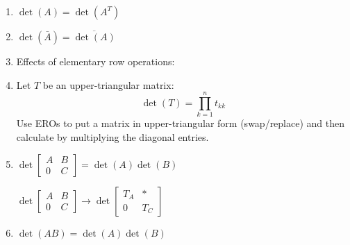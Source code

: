 \documentclass[letterpaper,12pt,fleqn]{article}
\begin{document}
\begin{properties}
  \listbreak
  \begin{enumerate}
  \item $\det(A)=\det(A^T)$
    
  \item $\det(\bar{A})=\overline{\det(A)}$
    
  \item Effects of elementary row operations:
    
  \item Let $T$ be an upper-triangular matrix:
    \[\det(T)=\prod_{k=1}^nt_{kk}\]
    Use EROs to put a matrix in upper-triangular form (swap/replace) and then
    calculate by multiplying the diagonal entries.

  \item $\det\begin{bmatrix} A & B \\ 0 & C \end{bmatrix}=\det(A)\det(B)$

    $\det\begin{bmatrix} A & B \\ 0 & C \end{bmatrix}\to
    \det\begin{bmatrix} T_A & * \\ 0 & T_C \end{bmatrix}$

  \item $\det(AB)=\det(A)\det(B)$

    \begin{theproof}
      \listbreak
\end{theproof}
\end{enumerate}
\end{properties}
\end{document}
